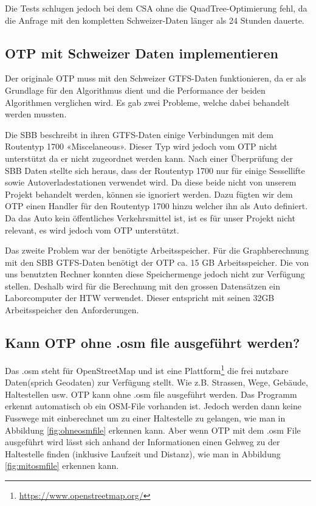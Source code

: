 Die Tests schlugen jedoch bei dem CSA ohne die QuadTree-Optimierung fehl, da die Anfrage mit den kompletten Schweizer-Daten länger als 24 Stunden dauerte.

\subsection{OTP mit Schweizer Daten implementieren}
Der originale OTP muss mit den Schweizer GTFS-Daten funktionieren, da er als Grundlage für den Algorithmus dient und die Performance der beiden Algorithmen verglichen wird. Es gab zwei Probleme, welche dabei behandelt werden mussten.
\newline

Die SBB beschreibt in ihren GTFS-Daten einige Verbindungen mit dem Routentyp 1700 «Miscelaneous». Dieser Typ wird jedoch vom OTP nicht unterstützt da er nicht zugeordnet werden kann. Nach einer Überprüfung der SBB Daten stellte sich heraus, dass der Routentyp 1700 nur für einige Sessellifte sowie Autoverladestationen verwendet wird. Da diese beide nicht von unserem Projekt behandelt werden, können sie ignoriert werden. Dazu fügten wir dem OTP einen Handler für den Routentyp 1700 hinzu welcher ihn als Auto definiert. Da das Auto kein öffentliches Verkehrsmittel ist, ist es für unser Projekt nicht relevant, es wird jedoch vom OTP unterstützt.
\newline


Das zweite Problem war der benötigte Arbeitsspeicher. Für die Graphberechnung mit den SBB GTFS-Daten benötigt der OTP ca. 15 GB Arbeitsspeicher. Die von uns benutzten Rechner konnten diese Speichermenge jedoch nicht zur Verfügung stellen. Deshalb wird für die Berechnung mit den grossen Datensätzen ein Laborcomputer der HTW verwendet. Dieser entspricht mit seinen 32GB Arbeitsspeicher den Anforderungen.


\subsection{Kann OTP ohne .osm file ausgeführt werden?}
Das .osm steht für OpenStreetMap und ist eine Plattform\footnote{\url{https://www.openstreetmap.org/}} die frei nutzbare Daten(sprich Geodaten) zur Verfügung stellt. Wie z.B. Strassen, Wege, Gebäude, Haltestellen usw. OTP kann ohne .osm file ausgeführt werden. Das Programm erkennt automatisch ob ein OSM-File vorhanden ist. Jedoch werden dann keine Fusswege mit einberechnet um zu einer Haltestelle zu gelangen, wie man in Abbildung \ref{fig:ohneosmfile} erkennen kann.
Aber wenn OTP mit dem .osm File ausgeführt wird lässt sich anhand der Informationen einen Gehweg zu der Haltestelle finden (inklusive Laufzeit und Distanz), wie man in Abbildung \ref{fig:mitosmfile} erkennen kann. 

